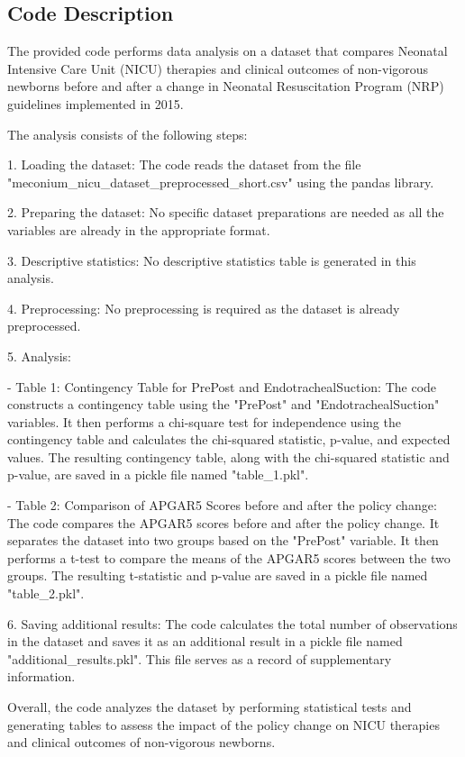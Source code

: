 \documentclass[11pt]{article}
\begin{document}
\subsection{Code Description}

The provided code performs data analysis on a dataset that compares Neonatal Intensive Care Unit (NICU) therapies and clinical outcomes of non-vigorous newborns before and after a change in Neonatal Resuscitation Program (NRP) guidelines implemented in 2015.

The analysis consists of the following steps:

1. Loading the dataset: The code reads the dataset from the file "meconium\_nicu\_dataset\_preprocessed\_short.csv" using the pandas library.

2. Preparing the dataset: No specific dataset preparations are needed as all the variables are already in the appropriate format.

3. Descriptive statistics: No descriptive statistics table is generated in this analysis.

4. Preprocessing: No preprocessing is required as the dataset is already preprocessed.

5. Analysis:

    - Table 1: Contingency Table for PrePost and EndotrachealSuction: The code constructs a contingency table using the "PrePost" and "EndotrachealSuction" variables. It then performs a chi-square test for independence using the contingency table and calculates the chi-squared statistic, p-value, and expected values. The resulting contingency table, along with the chi-squared statistic and p-value, are saved in a pickle file named "table\_1.pkl".

    - Table 2: Comparison of APGAR5 Scores before and after the policy change: The code compares the APGAR5 scores before and after the policy change. It separates the dataset into two groups based on the "PrePost" variable. It then performs a t-test to compare the means of the APGAR5 scores between the two groups. The resulting t-statistic and p-value are saved in a pickle file named "table\_2.pkl".

6. Saving additional results: The code calculates the total number of observations in the dataset and saves it as an additional result in a pickle file named "additional\_results.pkl". This file serves as a record of supplementary information.

Overall, the code analyzes the dataset by performing statistical tests and generating tables to assess the impact of the policy change on NICU therapies and clinical outcomes of non-vigorous newborns.
\end{document}

